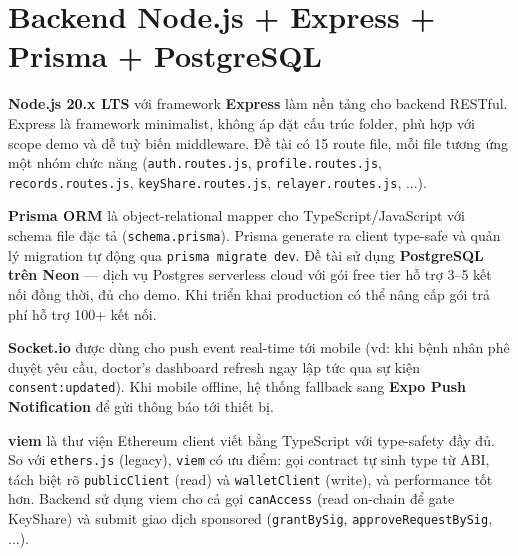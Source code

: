 \documentclass[../DoAn]{subfiles}
\begin{document}
\section{Backend Node.js + Express + Prisma + PostgreSQL}

\textbf{Node.js 20.x LTS} với framework \textbf{Express} làm nền tảng cho backend RESTful. Express là framework minimalist, không áp đặt cấu trúc folder, phù hợp với scope demo và dễ tuỳ biến middleware. Đề tài có 15 route file, mỗi file tương ứng một nhóm chức năng (\texttt{auth.routes.js}, \texttt{profile.routes.js}, \texttt{records.routes.js}, \texttt{keyShare.routes.js}, \texttt{relayer.routes.js}, ...).

\textbf{Prisma ORM} là object-relational mapper cho TypeScript/JavaScript với schema file đặc tả (\texttt{schema.prisma}). Prisma generate ra client type-safe và quản lý migration tự động qua \texttt{prisma migrate dev}. Đề tài sử dụng \textbf{PostgreSQL trên Neon} --- dịch vụ Postgres serverless cloud với gói free tier hỗ trợ 3--5 kết nối đồng thời, đủ cho demo. Khi triển khai production có thể nâng cấp gói trả phí hỗ trợ 100+ kết nối.

\textbf{Socket.io} được dùng cho push event real-time tới mobile (vd: khi bệnh nhân phê duyệt yêu cầu, doctor's dashboard refresh ngay lập tức qua sự kiện \texttt{consent:updated}). Khi mobile offline, hệ thống fallback sang \textbf{Expo Push Notification} để gửi thông báo tới thiết bị.

\textbf{viem} \cite{viem} là thư viện Ethereum client viết bằng TypeScript với type-safety đầy đủ. So với \texttt{ethers.js} (legacy), \texttt{viem} có ưu điểm: gọi contract tự sinh type từ ABI, tách biệt rõ \texttt{publicClient} (read) và \texttt{walletClient} (write), và performance tốt hơn. Backend sử dụng viem cho cả gọi \texttt{canAccess} (read on-chain để gate KeyShare) và submit giao dịch sponsored (\texttt{grantBySig}, \texttt{approveRequestBySig}, ...).
\end{document}
